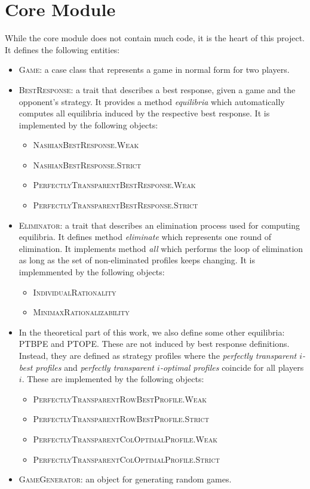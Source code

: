 \section{Core Module}
While the core module does not contain much code, it is the heart of this project.
It defines the following entities:
\begin{itemize}
	\item \textsc{Game}: a case class that represents a game in normal form for two players.
	\item \textsc{BestResponse}: a trait that describes a best response, given a game and the opponent's strategy.
	It provides a method \textit{equilibria} which automatically computes all equilibria induced by the respective best response.
	It is implemented by the following objects:
	\begin{itemize}
		\item \textsc{NashianBestResponse.Weak}
		\item \textsc{NashianBestResponse.Strict}
		\item \textsc{PerfectlyTransparentBestResponse.Weak}
		\item \textsc{PerfectlyTransparentBestResponse.Strict}
	\end{itemize}
	\item \textsc{Eliminator}: a trait that describes an elimination process used for computing equilibria.
	It defines method \textit{eliminate} which represents one round of elimination.
	It implements method \textit{all} which performs the loop of elimination as long as the set of non-eliminated profiles keeps changing.
	It is implemmented by the following objects:
	\begin{itemize}
		\item \textsc{IndividualRationality}
		\item \textsc{MinimaxRationalizability}
	\end{itemize}
	\item In the theoretical part of this work, we also define some other equilibria: PTBPE and PTOPE.
	These are not induced by best response definitions.
	Instead, they are defined as strategy profiles where the \textit{perfectly transparent $i$-best profiles} and \textit{perfectly transparent $i$-optimal profiles} coincide for all players $i$.
	These are implemented by the following objects:
	\begin{itemize}
		\item \textsc{PerfectlyTransparentRowBestProfile.Weak}
		\item \textsc{PerfectlyTransparentRowBestProfile.Strict}
		\item \textsc{PerfectlyTransparentColOptimalProfile.Weak}
		\item \textsc{PerfectlyTransparentColOptimalProfile.Strict}
	\end{itemize}
	\item \textsc{GameGenerator}: an object for generating random games.
\end{itemize}

